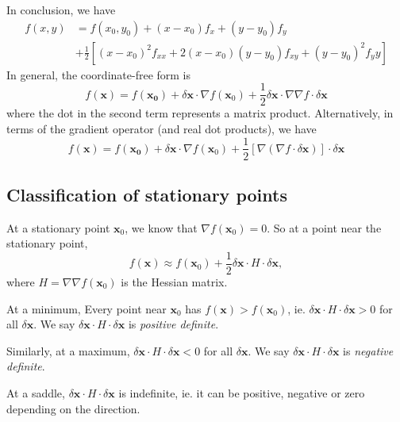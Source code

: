 \documentclass[a4paper]{article}
\begin{document}
In conclusion, we have
\begin{align*}
  f(x, y) &= f(x_0, y_0) + (x - x_0)f_x + (y - y_0)f_y \\
  &+ \frac{1}{2}[(x - x_0)^2 f_{xx} + 2(x - x_0)(y - y_0)f_{xy} + (y - y_0)^2 f_yy]
\end{align*}
In general, the coordinate-free form is
\[
  f(\mathbf{x}) = f(\mathbf{x_0}) + \delta \mathbf{x}\cdot\nabla f(\mathbf{x}_0) + \frac{1}{2}\delta \mathbf{x}\cdot \nabla \nabla f\cdot \delta \mathbf{x}
\]
where the dot in the second term represents a matrix product. Alternatively, in terms of the gradient operator (and real dot products), we have
\[
  f(\mathbf{x}) = f(\mathbf{x_0}) + \delta \mathbf{x}\cdot \nabla f(\mathbf{x}_0) + \frac{1}{2}[\nabla (\nabla f\cdot \delta \mathbf{x})]\cdot \delta\mathbf{x}
\]

\subsection{Classification of stationary points}
At a stationary point $\mathbf{x}_0$, we know that $\nabla f(\mathbf{x}_0) = 0$. So at a point near the stationary point,
\[
  f(\mathbf{x})\approx f(\mathbf{x}_0) + \frac{1}{2}\delta\mathbf{x}\cdot H\cdot \delta\mathbf{x},
\]
where $H = \nabla\nabla f(\mathbf{x}_0)$ is the Hessian matrix.

At a minimum, Every point near $\mathbf{x}_0$ has $f(\mathbf{x}) > f(\mathbf{x}_0)$, ie. $\delta \mathbf{x}\cdot H\cdot \delta \mathbf{x} > 0$ for all $\delta \mathbf{x}$. We say $\delta \mathbf{x}\cdot H\cdot\delta \mathbf{x}$ is \emph{positive definite}.

Similarly, at a maximum, $\delta \mathbf{x}\cdot H\cdot \delta\mathbf{x} < 0$ for all $\delta \mathbf{x}$. We say $\delta \mathbf{x}\cdot H\cdot \delta \mathbf{x}$ is \emph{negative definite}.

At a saddle, $\delta \mathbf{x} \cdot H\cdot \delta\mathbf{x}$ is indefinite, ie. it can be positive, negative or zero depending on the direction.
\end{document}
